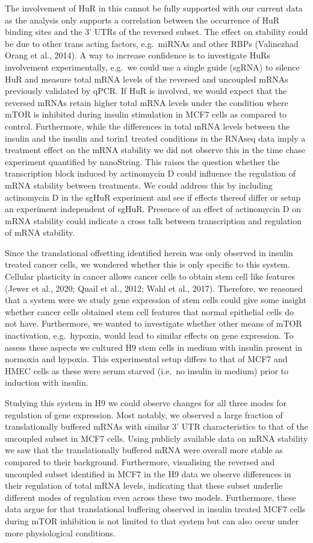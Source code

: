 \documentclass[12pt,openany]{book}
\begin{document}
The involvement of HuR in this cannot be fully supported with our
current data as the analysis only supports a correlation between the
occurrence of HuR binding sites and the 3' UTRs of the reversed subset.
The effect on stability could be due to other trans acting factors,
e.g.~miRNAs and other RBPs (Valinezhad Orang et al., 2014). A way to
increase confidence is to investigate HuRs involvement experimentally,
e.g.~we could use a single guide (sgRNA) to silence HuR and measure
total mRNA levels of the reversed and uncoupled mRNAs previously
validated by qPCR. If HuR is involved, we would expect that the reversed
mRNAs retain higher total mRNA levels under the condition where mTOR is
inhibited during insulin stimulation in MCF7 cells as compared to
control. Furthermore, while the differences in total mRNA levels between
the insulin and the insulin and torin1 treated conditions in the RNAseq
data imply a treatment effect on the mRNA stability we did not observe
this in the time chase experiment quantified by nanoString. This raises
the question whether the transcription block induced by actinomycin D
could influence the regulation of mRNA stability between treatments. We
could address this by including actinomycin D in the sgHuR experiment
and see if effects thereof differ or setup an experiment independent of
sgHuR. Presence of an effect of actinomycin D on mRNA stability could
indicate a cross talk between transcription and regulation of mRNA
stability.

Since the translational offsetting identified herein was only observed
in insulin treated cancer cells, we wondered whether this is only
specific to this system. Cellular plasticity in cancer allows cancer
cells to obtain stem cell like features (Jewer et al., 2020; Quail et
al., 2012; Wahl et al., 2017). Therefore, we reasoned that a system were
we study gene expression of stem cells could give some insight whether
cancer cells obtained stem cell features that normal epithelial cells do
not have. Furthermore, we wanted to investigate whether other means of
mTOR inactivation, e.g.~hypoxia, would lead to similar effects on gene
expression. To assess these aspects we cultured H9 stem cells in medium
with insulin present in normoxia and hypoxia. This experimental setup
differs to that of MCF7 and HMEC cells as these were serum starved
(i.e.~no insulin in medium) prior to induction with insulin.

Studying this system in H9 we could observe changes for all three modes
for regulation of gene expression. Most notably, we observed a large
fraction of translationally buffered mRNAs with similar 3' UTR
characteristics to that of the uncoupled subset in MCF7 cells. Using
publicly available data on mRNA stability we saw that the
translationally buffered mRNA were overall more stable as compared to
their background. Furthermore, visualising the reversed and uncoupled
subset identified in MCF7 in the H9 data we observe differences in their
regulation of total mRNA levels, indicating that these subset underlie
different modes of regulation even across these two models. Furthermore,
these data argue for that translational buffering observed in insulin
treated MCF7 cells during mTOR inhibition is not limited to that system
but can also occur under more physiological conditions.
\end{document}
